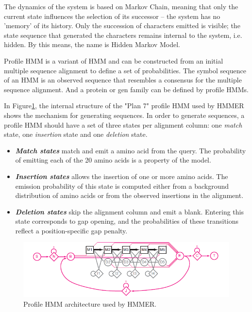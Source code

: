 The dynamics of the system is based on Markov Chain, meaning that only the current state influences the selection of its successor – the system has no 'memory' of its history. Only the succession of characters emitted is visible; the state sequence that generated the characters remains internal to the system, i.e. hidden. By this means, the name is Hidden Markov Model\citep{IntroBio}. 

Profile HMM is a variant of HMM and can be constructed from an initial multiple sequence alignment to define a set of probabilities. The symbol sequence of an HMM is an observed sequence that resembles a consensus for the multiple sequence alignment. And a protein or gen family can be defined by profile HMMs.

In Figure\ref{fig:pHMM}, the internal structure of the "Plan 7" profile HMM used by HMMER\citep{HMMER3} shows the mechanism for generating sequences. In order to generate sequences, a profile HMM should have a set of three states per alignment column: one \emph{match} state, one \emph{insertion} state and one \emph{deletion} state. 
\begin{itemize}
\item \textbf{\emph{Match states}} match and emit a amino acid from the query. The probability of emitting each of the 20 amino acids is a property of the model. 
\item \textbf{\emph{Insertion states}} allows the insertion of one or more amino acids. The emission probability of this state is computed either from a background distribution of amino acids or from the observed insertions in the alignment.
\item \textbf{\emph{Deletion states}} skip the alignment column and emit a blank. Entering this state corresponds to gap opening, and the probabilities of these transitions reflect a position-specific gap penalty.
\end{itemize}

\begin{figure}[!htb]
	\includegraphics[width=150mm]{Figures/pHMM.png}
	\caption{Profile HMM architecture used by HMMER\citep{HMMER3}.}
	\label{fig:pHMM}
\end{figure}


